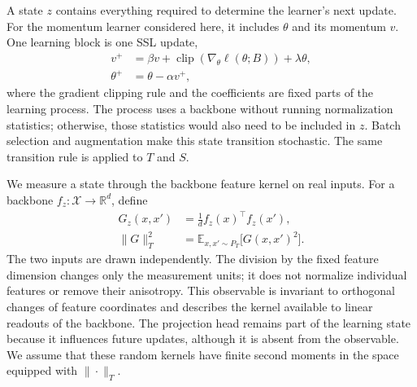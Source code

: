 A state $z$ contains everything required to determine the learner's next update. For the momentum learner considered here, it includes $\theta$ and its momentum $v$. One learning block is one SSL update,
\begin{equation}
\begin{aligned}
v^+&=\beta v+\operatorname{clip}(\nabla_\theta\ell(\theta;B))+\lambda\theta,\\
\theta^+&=\theta-\alpha v^+,
\end{aligned}
\label{eq:m3-update}
\end{equation}
where the gradient clipping rule and the coefficients are fixed parts of the learning process. The process uses a backbone without running normalization statistics; otherwise, those statistics would also need to be included in $z$. Batch selection and augmentation make this state transition stochastic. The same transition rule is applied to $T$ and $S$.

We measure a state through the backbone feature kernel on real inputs. For a backbone $f_z:\mathcal X\rightarrow\mathbb R^d$, define
\begin{equation}
\begin{aligned}
G_z(x,x')&=\frac{1}{d}f_z(x)^\top f_z(x'),\\
\|G\|_T^2&=\mathbb E_{x,x'\sim P_T}\big[G(x,x')^2\big].
\end{aligned}
\label{eq:m3-kernel}
\end{equation}
The two inputs are drawn independently. The division by the fixed feature dimension changes only the measurement units; it does not normalize individual features or remove their anisotropy. This observable is invariant to orthogonal changes of feature coordinates and describes the kernel available to linear readouts of the backbone. The projection head remains part of the learning state because it influences future updates, although it is absent from the observable. We assume that these random kernels have finite second moments in the space equipped with $\|\cdot\|_T$.


